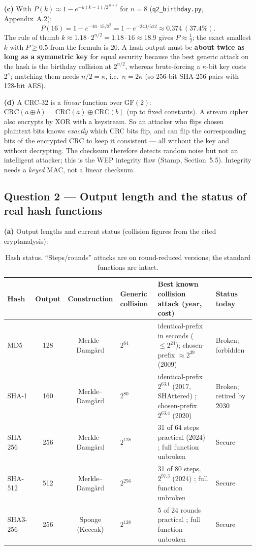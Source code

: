 \documentclass[11pt,a4paper]{article}
\begin{document}
\textbf{(c)} With $P(k)\approx 1-e^{-k(k-1)/2^{\,n+1}}$ for $n=8$ (\texttt{q2\_birthday.py}, Appendix~A.2):
\[
P(16) = 1-e^{-16\cdot 15/2^{9}} = 1-e^{-240/512} \approx 0.374\ (37.4\%).
\]
The rule of thumb $k\approx 1.18\cdot 2^{n/2}=1.18\cdot 16 \approx 18.9$ gives $P\approx\tfrac12$; the exact
smallest $k$ with $P\ge 0.5$ from the formula is $20$. A hash output must be \textbf{about twice as long
as a symmetric key} for equal security because the best generic attack on the hash is the birthday
collision at $2^{n/2}$, whereas brute-forcing a $\kappa$-bit key costs $2^{\kappa}$; matching them needs
$n/2=\kappa$, i.e.\ $n=2\kappa$ (so 256-bit SHA-256 pairs with 128-bit AES).

\textbf{(d)} A CRC-32 is a \emph{linear} function over $\mathrm{GF}(2)$: $\mathrm{CRC}(a\oplus b) =
\mathrm{CRC}(a)\oplus\mathrm{CRC}(b)$ (up to fixed constants). A stream cipher also encrypts by XOR with a
keystream. So an attacker who flips chosen plaintext bits knows \emph{exactly} which CRC bits flip, and
can flip the corresponding bits of the encrypted CRC to keep it consistent --- all without the key and
without decrypting. The checksum therefore detects random noise but not an intelligent attacker; this is
the WEP integrity flaw (Stamp, Section~5.5). Integrity needs a \emph{keyed} MAC, not a linear checksum.

\subsection*{Question 2 --- Output length and the status of real hash functions}
\textbf{(a)} Output lengths and current status (collision figures from the cited cryptanalysis):
\begin{table}[H]
\centering\small
\begin{tabularx}{\textwidth}{@{}lccP{1.5cm}LP{2.0cm}@{}}
\toprule
Hash & Output & Construction & Generic collision & Best known collision attack (year, cost) & Status today \\
\midrule
MD5 & 128 & Merkle--Damg\aa rd & $2^{64}$ & identical-prefix in seconds ($\le 2^{24}$); chosen-prefix $\approx 2^{39}$ (2009) \cite{stevenscp} & Broken; forbidden \\
SHA-1 & 160 & Merkle--Damg\aa rd & $2^{80}$ & identical-prefix $2^{63.1}$ (2017, SHAttered) \cite{shattered}; chosen-prefix $2^{63.4}$ (2020) \cite{shambles} & Broken; retired by 2030 \cite{nistsha1} \\
SHA-256 & 256 & Merkle--Damg\aa rd & $2^{128}$ & 31 of 64 steps practical (2024) \cite{sha2coll}; full function unbroken & Secure \\
SHA-512 & 512 & Merkle--Damg\aa rd & $2^{256}$ & 31 of 80 steps, $2^{97.3}$ (2024) \cite{sha2coll}; full function unbroken & Secure \\
SHA3-256 & 256 & Sponge (Keccak) & $2^{128}$ & 5 of 24 rounds practical \cite{sha3coll}; full function unbroken & Secure \\
\bottomrule
\end{tabularx}
\caption{Hash status. ``Steps/rounds'' attacks are on round-reduced versions; the standard functions are intact.}
\end{table}
\end{document}
